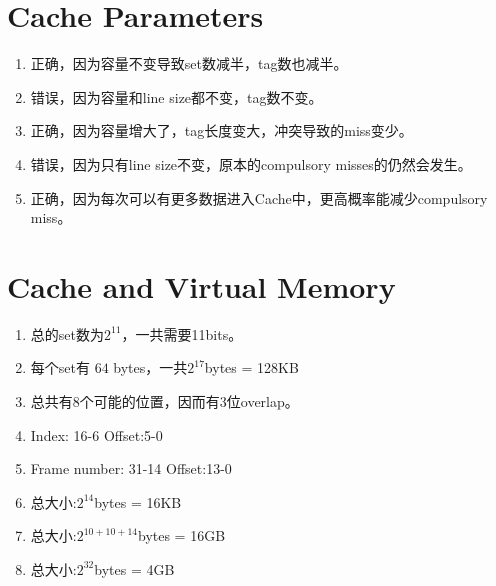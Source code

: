 \documentclass[a4paper,11pt]{article}
\begin{document}
\section{Cache Parameters}
\begin{enumerate}
	\item 正确，因为容量不变导致set数减半，tag数也减半。
	\item 错误，因为容量和line size都不变，tag数不变。
	\item 正确，因为容量增大了，tag长度变大，冲突导致的miss变少。
	\item 错误，因为只有line size不变，原本的compulsory misses的仍然会发生。
	\item 正确，因为每次可以有更多数据进入Cache中，更高概率能减少compulsory miss。
\end{enumerate}
\section{Cache and Virtual Memory}
\begin{enumerate}
	\item 总的set数为$2^{11}$，一共需要11bits。
	\item 每个set有 $64$ bytes，一共$2^{17}$bytes = 128KB
	\item 总共有8个可能的位置，因而有3位overlap。
	\item Index: 16-6 Offset:5-0
	\item Frame number: 31-14 Offset:13-0
	\item 总大小:$2^{14}$bytes = 16KB
	\item 总大小:$2^{10 + 10 + 14}$bytes = 16GB
	\item 总大小:$2^32$bytes = 4GB
\end{enumerate}
\end{document}
